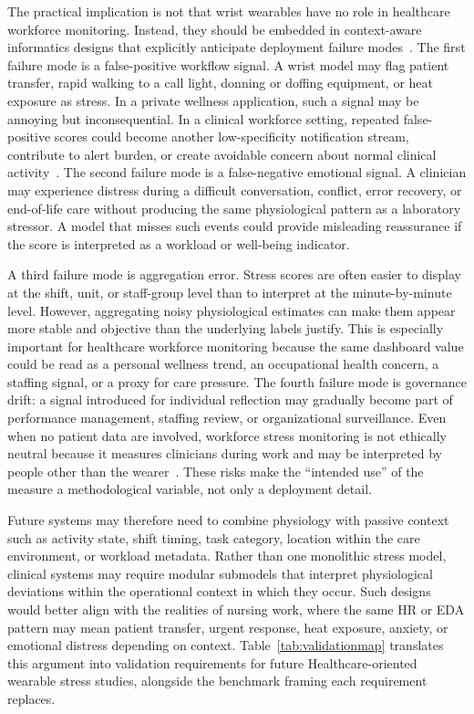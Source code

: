 \documentclass[healthcare,article,submit,moreauthors,pdftex]{Definitions/mdpi}
\begin{document}
The practical implication is not that wrist wearables have no role in healthcare
workforce monitoring. Instead, they should be embedded in context-aware
informatics designs that explicitly anticipate deployment failure
modes~\cite{virgillito2025wearablesorg}. The first failure mode is a
false-positive workflow signal. A wrist model may flag patient transfer, rapid
walking to a call light, donning or doffing equipment, or heat exposure as
stress. In a private wellness application, such a signal may be annoying but
inconsequential. In a clinical workforce setting, repeated false-positive scores
could become another low-specificity notification stream, contribute to alert
burden, or create avoidable concern about normal clinical
activity~\cite{ancker2017alertfatigue,lewandowska2020alarmfatigue,
ruppel2023alarmburden,gulsen2025alarmfatigue}. The second failure mode is a
false-negative emotional signal. A clinician may experience distress during a
difficult conversation,
conflict, error recovery, or end-of-life care without producing the same
physiological pattern as a laboratory stressor. A model that misses such events
could provide misleading reassurance if the score is interpreted as a workload or
well-being indicator.

A third failure mode is aggregation error. Stress scores are often easier to
display at the shift, unit, or staff-group level than to interpret at the
minute-by-minute level. However, aggregating noisy physiological estimates can
make them appear more stable and objective than the underlying labels justify.
This is especially important for healthcare workforce monitoring because the
same dashboard value could be read as a personal wellness trend, an occupational
health concern, a staffing signal, or a proxy for care pressure. The fourth
failure mode is governance drift: a signal introduced for individual reflection
may gradually become part of performance management, staffing review, or
organizational surveillance. Even when no patient data are involved, workforce
stress monitoring is not ethically neutral because it measures clinicians during
work and may be interpreted by people other than the
wearer~\cite{martinezmartin2021ethical,ajunwa2017surveillance}. These risks make
the ``intended use'' of the measure a methodological variable, not only a
deployment detail.

Future systems may therefore need to combine physiology with passive context such
as activity state, shift timing, task category, location within the care
environment, or workload metadata. Rather than one monolithic stress model,
clinical systems may require modular submodels that interpret physiological
deviations within the operational context in which they occur. Such designs would
better align with the realities of nursing work, where the same HR or EDA pattern
may mean patient transfer, urgent response, heat exposure, anxiety, or emotional
distress depending on context. Table~\ref{tab:validationmap} translates this
argument into validation requirements for future Healthcare-oriented wearable
stress studies, alongside the benchmark framing each requirement replaces.
\end{document}
